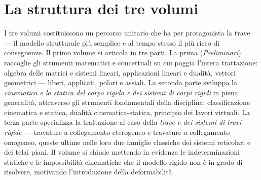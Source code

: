 

\section*{La struttura dei tre volumi}

I tre volumi costituiscono un percorso unitario che ha per
protagonista la trave --- il modello strutturale più
semplice e al tempo stesso il più ricco di conseguenze. Il
primo volume si articola in tre parti. La prima
(\emph{Preliminari}) raccoglie gli strumenti matematici e
concettuali su cui poggia l'intera trattazione: algebra
delle matrici e sistemi lineari, applicazioni lineari e
dualità, vettori geometrici --- liberi, applicati, polari e
assiali. La seconda parte sviluppa la \emph{cinematica e la
	statica del corpo rigido e dei sistemi di corpi rigidi} in
piena generalità, attraverso gli strumenti fondamentali
della disciplina: classificazione cinematica e statica,
dualità cinematica-statica, principio dei lavori virtuali.
La terza parte specializza la trattazione al caso della
\emph{trave e dei sistemi di travi rigide} --- travature a
collegamento eterogeneo e travature a collegamento omogeneo,
queste ultime nelle loro due famiglie classiche dei sistemi
reticolari e dei telai piani. Il volume si chiude mettendo
in evidenza le indeterminazioni statiche e le impossibilità
cinematiche che il modello rigido non è in grado di
risolvere, motivando l'introduzione della deformabilità.


